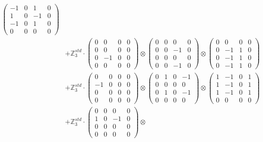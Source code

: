 \documentclass{article}
\begin{document}
{\begin{align}
            \begin{pmatrix} -1 & 0 & 1 & 0 \\ 1 & 0 & -1 & 0 \\ -1 & 0 & 1 & 0 \\ 0 & 0 & 0 & 0 \end{pmatrix} \\ 
        &+ \label{Rs12-Rc12-Solution-1-c23} \mathbb{Z}_3^{std} \cdot 
            \begin{pmatrix} 0 & 0 & 0 & 0 \\ 0 & 0 & 0 & 0 \\ 0 & -1 & 0 & 0 \\ 0 & 0 & 0 & 0 \end{pmatrix} \otimes 
            \begin{pmatrix} 0 & 0 & 0 & 0 \\ 0 & 0 & -1 & 0 \\ 0 & 0 & 0 & 0 \\ 0 & 0 & -1 & 0 \end{pmatrix} \otimes 
            \begin{pmatrix} 0 & 0 & 0 & 0 \\ 0 & -1 & 1 & 0 \\ 0 & -1 & 1 & 0 \\ 0 & -1 & 1 & 0 \end{pmatrix} \\ 
        &+ \label{Rs12-Rc12-Solution-1-c24} \mathbb{Z}_3^{std} \cdot 
            \begin{pmatrix} 0 & 0 & 0 & 0 \\ -1 & 0 & 0 & 0 \\ 0 & 0 & 0 & 0 \\ 0 & 0 & 0 & 0 \end{pmatrix} \otimes 
            \begin{pmatrix} 0 & 1 & 0 & -1 \\ 0 & 0 & 0 & 0 \\ 0 & 1 & 0 & -1 \\ 0 & 0 & 0 & 0 \end{pmatrix} \otimes 
            \begin{pmatrix} 1 & -1 & 0 & 1 \\ 1 & -1 & 0 & 1 \\ 1 & -1 & 0 & 1 \\ 0 & 0 & 0 & 0 \end{pmatrix} \\ 
        &+ \label{Rs12-Rc12-Solution-1-c25} \mathbb{Z}_3^{std} \cdot 
            \begin{pmatrix} 0 & 0 & 0 & 0 \\ 1 & 0 & -1 & 0 \\ 0 & 0 & 0 & 0 \\ 0 & 0 & 0 & 0 \end{pmatrix} \otimes 

\end{align}}
\end{document}
